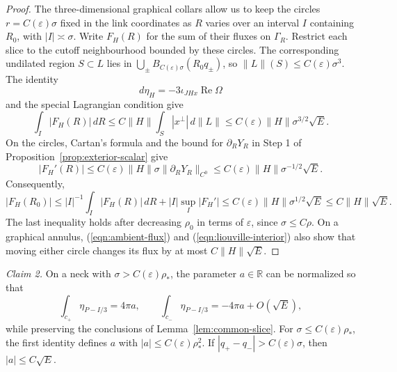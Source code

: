 \documentclass[11pt,a4paper]{article}
\numberwithin{equation}{section}
\theoremstyle{definition}
\theoremstyle{remark}
\newcommand{\R}{\mathbb R}
\newcommand{\Ree}{\operatorname{Re}}
\begin{document}
	\begin{proof}
		The three-dimensional graphical collars
		allow us to keep the circles $r=C(\varepsilon)\sigma$ fixed in the link coordinates
		as $R$ varies over an interval $I$ containing $R_0$, with $|I|\asymp\sigma$.
		Write $F_H(R)$ for the sum of their fluxes on $\Gamma_R$.
		Restrict each slice to the cutoff neighbourhood bounded by these circles.
		The corresponding undilated region $S\subset L$ lies in
		$\bigcup_\pm B_{C(\varepsilon)\sigma}(R_0q_\pm)$, so
		$\|L\|(S)\le C(\varepsilon)\sigma^3$.
		The identity
		\begin{equation}\label{eqn:ambient-flux}
			d\eta_H=-3\iota_{JHx}\Ree\Omega
		\end{equation}
		and the special Lagrangian condition give
		\[
		\int_I|F_H(R)|\,dR
		\le C\|H\|\int_S|x^\perp|\,d\|L\|
		\le C(\varepsilon)\|H\|\sigma^{3/2}\sqrt E.
		\]
		On the circles, Cartan's formula and the bound for $\partial_RY_R$
		in Step 1 of Proposition~\ref{prop:exterior-scalar} give
		\[
		|F_H'(R)|
		\le C(\varepsilon)\|H\|\sigma\|\partial_RY_R\|_{C^0}
		\le C(\varepsilon)\|H\|\sigma^{-1/2}\sqrt E.
		\]
		Consequently,
		\[
		|F_H(R_0)|
		\le |I|^{-1}\int_I|F_H(R)|\,dR+|I|\sup_I|F_H'|
		\le C(\varepsilon)\|H\|\sigma^{1/2}\sqrt E
		\le C\|H\|\sqrt E.
		\]
		The last inequality holds after decreasing $\rho_0$ in terms of
		$\varepsilon$, since $\sigma\le C\rho$.
		On a graphical annulus, (\ref{eqn:ambient-flux}) and
		(\ref{eqn:liouville-interior}) also show that moving either circle
		changes its flux by at most $C\|H\|\sqrt E$.
	\end{proof}
	
	\smallskip
	\noindent\emph{Claim 2.} On a neck with $\sigma>C(\varepsilon)\rho_*$, the parameter
	$a\in\R$ can be normalized so that
	\begin{equation}\label{eqn:flux-coefficient}
		\int_{c_+}\eta_{P-I/3}=4\pi a,\qquad
		\int_{c_-}\eta_{P-I/3}=-4\pi a+O(\sqrt E),
	\end{equation}
	while preserving the conclusions of Lemma~\ref{lem:common-slice}.
	For $\sigma\le C(\varepsilon)\rho_*$, the first identity defines $a$ with
	$|a|\le C(\varepsilon)\rho_*^2$.
	If $|q_+-q_-|>C(\varepsilon)\sigma$, then $|a|\le C\sqrt E$.
	
\end{document}
